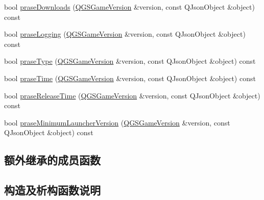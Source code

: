\begin{DoxyCompactItemize}
bool \mbox{\hyperlink{class_q_g_s_general_game_version_prase_strategy_a387e3c682e810a924500f09b96dedba4}{prase\+Downloads}} (\mbox{\hyperlink{class_q_g_s_game_version}{Q\+G\+S\+Game\+Version}} \&version, const Q\+Json\+Object \&object) const
\item 
bool \mbox{\hyperlink{class_q_g_s_general_game_version_prase_strategy_a341903ec36d1fd87c53407a01200f2d5}{prase\+Logging}} (\mbox{\hyperlink{class_q_g_s_game_version}{Q\+G\+S\+Game\+Version}} \&version, const Q\+Json\+Object \&object) const
\item 
bool \mbox{\hyperlink{class_q_g_s_general_game_version_prase_strategy_a74941876ccf051cb95e34802bb176724}{prase\+Type}} (\mbox{\hyperlink{class_q_g_s_game_version}{Q\+G\+S\+Game\+Version}} \&version, const Q\+Json\+Object \&object) const
\item 
bool \mbox{\hyperlink{class_q_g_s_general_game_version_prase_strategy_a9567c16470ff9d2e29995f62e9c6d7c1}{prase\+Time}} (\mbox{\hyperlink{class_q_g_s_game_version}{Q\+G\+S\+Game\+Version}} \&version, const Q\+Json\+Object \&object) const
\item 
bool \mbox{\hyperlink{class_q_g_s_general_game_version_prase_strategy_a41ed8076355c285b2e4a3597944c907c}{prase\+Release\+Time}} (\mbox{\hyperlink{class_q_g_s_game_version}{Q\+G\+S\+Game\+Version}} \&version, const Q\+Json\+Object \&object) const
\item 
bool \mbox{\hyperlink{class_q_g_s_general_game_version_prase_strategy_aa47751e46224d85a7e025b8c420cdebc}{prase\+Minimum\+Launcher\+Version}} (\mbox{\hyperlink{class_q_g_s_game_version}{Q\+G\+S\+Game\+Version}} \&version, const Q\+Json\+Object \&object) const
\end{DoxyCompactItemize}
\subsection*{额外继承的成员函数}


\subsection{构造及析构函数说明}
\mbox{\label{class_q_g_s_general_game_version_prase_strategy_a01703c9d469170fac462e5387744be23}} 
